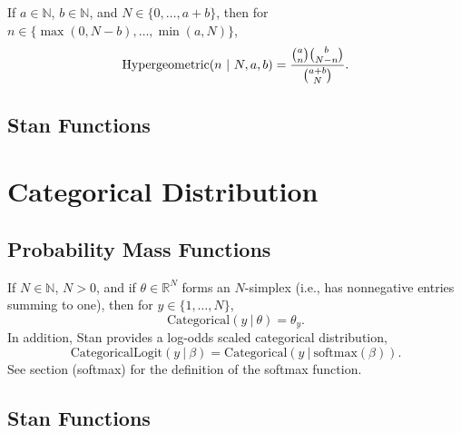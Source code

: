 \begin{description}
{\begin{description}
If $a \in \mathbb{N}$, $b \in \mathbb{N}$, and $N \in \{0,\ldots,a+b\}$, then for $n \in \{\max(0,N-b),\ldots,\min(a,N)\}$, \[ \text{Hypergeometric}(n~|~N,a,b) = \frac{\normalsize{\binom{a}{n} \binom{b}{N - n}}}      {\normalsize{\binom{a + b}{N}}}. \] 



\subsection{Stan Functions}


\begin{description}    \end{description}


\begin{description}  \end{description}


\section{Categorical Distribution}\label{categorical-distribution.section}


\subsection{Probability Mass Functions}


If $N \in \mathbb{N}$, $N > 0$, and if $\theta \in \mathbb{R}^N$ forms an $N$-simplex (i.e., has nonnegative entries summing to one), then for $y \in \{1,\ldots,N\}$, \[ \text{Categorical}(y~|~\theta) = \theta_y. \] In addition, Stan provides a log-odds scaled categorical distribution, \[ \text{CategoricalLogit}(y~|~\beta) = \text{Categorical}(y~|~\text{softmax}(\beta)). \] See section \@ref(softmax) for the definition of the softmax function.




\subsection{Stan Functions}



\end{description}}
\end{description}
